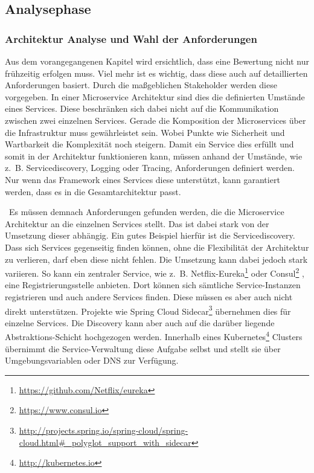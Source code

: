 \subsection{Analysephase}


\subsubsection{Architektur Analyse und Wahl der Anforderungen}

Aus dem vorangegangenen Kapitel wird ersichtlich, dass eine Bewertung nicht nur frühzeitig erfolgen muss. Viel mehr ist es wichtig, dass diese auch auf detaillierten Anforderungen basiert. Durch die maßgeblichen Stakeholder werden diese vorgegeben. In einer Microservice Architektur sind dies die definierten Umstände eines Services. Diese beschränken sich dabei nicht auf die Kommunikation zwischen zwei einzelnen Services. Gerade die Komposition der Microservices über die Infrastruktur muss gewährleistet sein. Wobei Punkte wie Sicherheit und Wartbarkeit die Komplexität noch steigern.
Damit ein Service dies erfüllt und somit in der Architektur funktionieren kann, müssen anhand der Umstände, wie z.~B. Servicediscovery, Logging oder Tracing, Anforderungen definiert werden. Nur wenn das Framework eines Services diese unterstützt, kann garantiert werden, dass es in die Gesamtarchitektur passt.

\
Es müssen demnach Anforderungen gefunden werden, die die Microservice Architektur an die einzelnen Services stellt. Das ist dabei stark von der Umsetzung dieser abhängig. Ein gutes Beispiel hierfür ist die Servicediscovery. Dass sich Services gegenseitig finden können, ohne die Flexibilität der Architektur zu verlieren, darf eben diese nicht fehlen. Die Umsetzung kann dabei jedoch stark variieren. So kann ein zentraler Service, wie z.~B. Netflix-Eureka\footnote{
\url{https://github.com/Netflix/eureka}
}
oder Consul\footnote{
\url{https://www.consul.io}
}
, eine Registrierungsstelle anbieten. Dort können sich sämtliche Service-Instanzen registrieren und auch andere Services finden. Diese müssen es aber auch nicht direkt unterstützen. Projekte wie Spring Cloud Sidecar\footnote{
\url{http://projects.spring.io/spring-cloud/spring-cloud.html\#_polyglot_support_with_sidecar}
}
übernehmen dies für einzelne Services. Die Discovery kann aber auch auf die darüber liegende Abstraktions-Schicht hochgezogen werden. Innerhalb eines Kubernetes\footnote{
\url{http://kubernetes.io}
}
Clusters übernimmt die Service-Verwaltung diese Aufgabe selbst und stellt sie über Umgebungsvariablen oder DNS zur Verfügung. 

